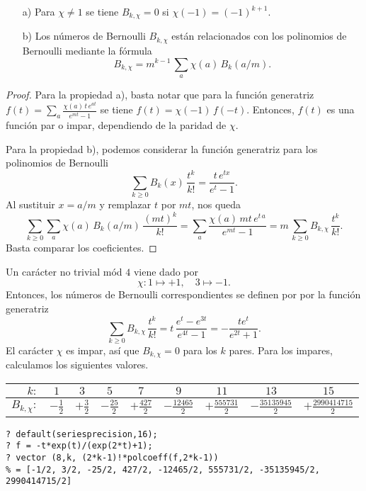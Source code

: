 \begin{proposicion}
  \begin{enumerate}
  \item[a)] Para $\chi \ne 1$ se tiene $B_{k,\chi} = 0$ si
    $\chi (-1) = (-1)^{k+1}$.

  \item[b)] Los números de Bernoulli $B_{k,\chi}$ están relacionados con los
    polinomios de Bernoulli mediante la fórmula
    $$B_{k,\chi} = m^{k-1} \, \sum_a \chi (a)\,B_k (a/m).$$
  \end{enumerate}

  \begin{proof}
    Para la propiedad a), basta notar que para la función generatriz
    $f (t) = \sum_a \frac{\chi (a)\,t\,e^{at}}{e^{mt}-1}$
    se tiene $f (t) = \chi (-1) \, f (-t)$. Entonces, $f (t)$ es una función par
    o impar, dependiendo de la paridad de $\chi$.

    Para la propiedad b), podemos considerar la función generatriz para los
    polinomios de Bernoulli
    $$\sum_{k \ge 0} B_k (x) \, \frac{t^k}{k!} = \frac{t\,e^{tx}}{e^t - 1}.$$
    Al sustituir $x = a/m$ y remplazar $t$ por $mt$, nos queda
    \[ \sum_{k \ge 0} \sum_a \chi (a)\,B_k (a/m) \, \frac{(mt)^k}{k!} =
       \sum_a \frac{\chi(a)\,mt\,e^{t\,a}}{e^{mt}-1} =
       m\,\sum_{k\ge 0} B_{k,\chi}\,\frac{t^k}{k!}. \]
    Basta comparar los coeficientes.
  \end{proof}
\end{proposicion}

\begin{ejemplo}
  Un carácter no trivial mód $4$ viene dado por
  $$\chi\colon 1 \mapsto +1, \quad 3 \mapsto -1.$$
  Entonces, los números de Bernoulli correspondientes se definen por por
  la función generatriz
  \[ \sum_{k\ge 0} B_{k,\chi}\,\frac{t^k}{k!} =
     t\,\frac{e^t - e^{3t}}{e^{4t}-1}
     = -\frac{te^t}{e^{2t}+1}. \]
  El carácter $\chi$ es impar, así que $B_{k,\chi} = 0$ para los $k$ pares. Para
  los impares, calculamos los siguientes valores.

  \begin{center}
    \renewcommand{\arraystretch}{1.5}
    \begin{tabular}{rcccccccc}
      \hline
      $k\colon$ & $1$ & $3$ & $5$ & $7$ & $9$ & $11$ & $13$ & $15$ \\
      \hline
      $B_{k,\chi}\colon$ & $-\frac{1}{2}$ & $+\frac{3}{2}$ & $-\frac{25}{2}$ & $+\frac{427}{2}$ & $-\frac{12465}{2}$ & $+\frac{555731}{2}$ & $-\frac{35135945}{2}$ & $+\frac{2990414715}{2}$ \\
      \hline
    \end{tabular}
  \end{center}

\begin{shaded}\small
\begin{verbatim}
? default(seriesprecision,16);
? f = -t*exp(t)/(exp(2*t)+1);
? vector (8,k, (2*k-1)!*polcoeff(f,2*k-1))
% = [-1/2, 3/2, -25/2, 427/2, -12465/2, 555731/2, -35135945/2, 2990414715/2]
\end{verbatim}
\end{shaded}
\end{ejemplo}

